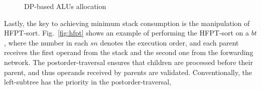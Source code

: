 \begin{figure}[!ht]
    \begin{center}
        \hfill
        \hfill
    \end{center}
    \caption{DP-based ALUs allocation}
    \label{fig:alloc}
\end{figure}
\indent
Lastly, the key to achieving minimum stack consumption is the manipulation of HFPT-sort.
Fig.~\ref{fig:hfpt} shows an example of performing the HFPT-sort on a $bt$, 
where the number in each $sn$ denotes the execution order, 
and each parent receives the first operand from the stack and the second one from the forwarding network.
The postorder-traversal ensures that children are processed before their parent, 
and thus operands received by parents are validated. 
Conventionally, the left-subtree has the priority in the postorder-traversal, 
